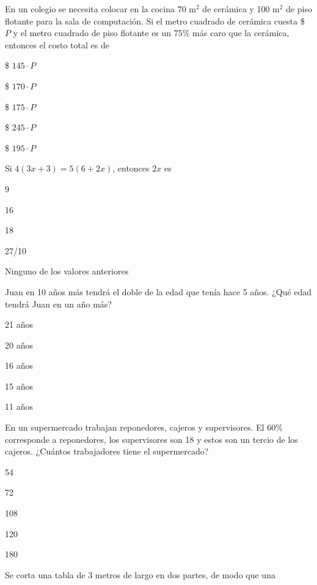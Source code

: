 \documentclass{sn-guia}
\begin{document}
\begin{problemas}
\begin{alternativas}[]
    \end{alternativas}
    \problema En un colegio se necesita colocar en la cocina 70 $\textrm{m}^2$ de 
    cerámica y 100  $\textrm{m}^2$ de piso flotante para la sala de computación. Si 
    el metro cuadrado de cerámica cuesta \$ $P$ y el metro cuadrado de piso flotante 
    es un 75\% más caro que la cerámica, entonces el costo total es de
    \begin{alternativas}[]
        \item \$ $145\cdot P$
        \item \$ $170\cdot P$
        \item \$ $175\cdot P$
        \item \$ $245\cdot P$
        \item \$ $195\cdot P$
    \end{alternativas}
    \problema Si $4(3x+3) = 5(6+2x)$, entonces $2x$ es
    \begin{alternativas}[]
        \item 9
        \item 16
        \item 18
        \item 27/10
        \item Ninguno de los valores anteriores
    \end{alternativas}
    \problema Juan en 10 años más tendrá el doble de la edad que tenía hace 5 años.
    ¿Qué edad tendrá Juan en un año más?
    \begin{alternativas}[]
        \item 21 años
        \item 20 años
        \item 16 años
        \item 15 años
        \item 11 años
    \end{alternativas}
    \problema En un supermercado trabajan reponedores, cajeros y supervisores. El 60\% 
    corresponde a reponedores, los supervisores son 18 y estos son un tercio de los 
    cajeros. ¿Cuántos trabajadores tiene el supermercado?
    \begin{alternativas}[]
        \item 54
        \item 72
        \item 108
        \item 120
        \item 180
    \end{alternativas}
    \problema Se corta una tabla de 3 metros de largo en dos partes, de modo que una 

\end{problemas}
\end{document}
